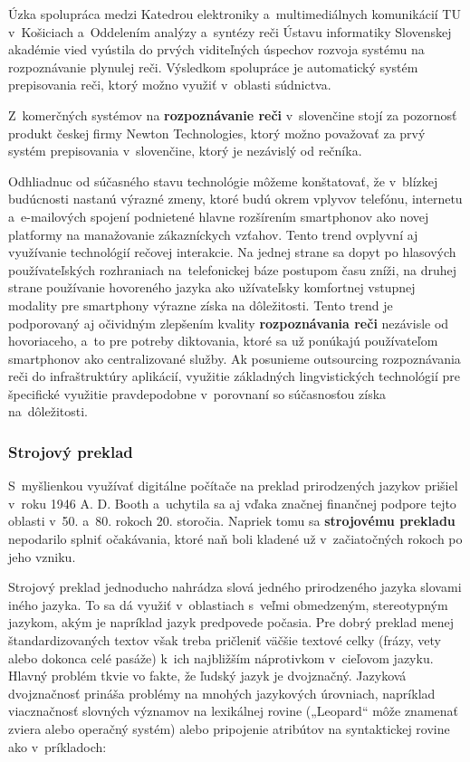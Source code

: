 \begin{multicols}{2}
Úzka spolupráca medzi Katedrou elektroniky a~multimediálnych komunikácií TU v~Košiciach a~Oddelením analýzy a~syntézy reči Ústavu informatiky Slovenskej akadémie vied vyústila do prvých viditeľných úspechov rozvoja systému na rozpoznávanie plynulej reči. Výsledkom spolupráce je automatický systém prepisovania reči, ktorý možno využiť v~oblasti súdnictva.

Z~komerčných systémov na \textbf{rozpoznávanie reči} v~slovenčine stojí za pozornosť produkt českej firmy Newton Technologies, ktorý možno považovať za prvý systém prepisovania v~slovenčine, ktorý je nezávislý od rečníka.

Odhliadnuc od súčasného stavu technológie môžeme konštatovať, že v~blízkej budúcnosti nastanú výrazné zmeny, ktoré budú okrem vplyvov telefónu, internetu a~e-mailových spojení podnietené hlavne rozšírením smartphonov ako novej platformy na manažovanie zákazníckych vzťahov. Tento trend ovplyvní aj využívanie technológií rečovej interakcie. Na jednej strane sa dopyt po hlasových používateľských rozhraniach na~telefonickej báze postupom času zníži, na druhej strane používanie hovoreného jazyka ako užívateľsky komfortnej vstupnej modality pre smartphony výrazne získa na dôležitosti. Tento trend je podporovaný aj očividným zlepšením kvality \textbf{rozpoznávania reči} nezávisle od hovoriaceho, a~to pre potreby diktovania, ktoré sa už ponúkajú používateľom smartphonov ako centralizované služby. Ak posunieme outsourcing rozpoznávania reči do infraštruktúry aplikácií, využitie základných lingvistických technológií pre špecifické využitie pravdepodobne v~porovnaní so súčasnosťou získa na~dôležitosti.  

\subsubsection{Strojový preklad}
S~myšlienkou využívať digitálne počítače na preklad
prirodzených jazykov prišiel v~roku 1946 A. D. Booth a~uchytila sa aj
vďaka značnej finančnej podpore tejto oblasti v~50. a~80. rokoch 20.
storočia. Napriek tomu sa \textbf{strojovému prekladu} nepodarilo
splniť očakávania, ktoré naň boli kladené už v~začiatočných
rokoch po jeho vzniku.

Strojový preklad jednoducho nahrádza slová jedného prirodzeného
jazyka slovami iného jazyka. To sa dá využiť v~oblastiach s~veľmi
obmedzeným, stereotypným jazykom, akým je napríklad jazyk predpovede
počasia. Pre dobrý preklad menej štandardizovaných textov však
treba pričleniť väčšie textové celky (frázy, vety alebo dokonca
celé pasáže) k~ich najbližším náprotivkom v~cieľovom jazyku.
Hlavný problém tkvie vo fakte, že ľudský jazyk je dvojznačný.
Jazyková dvojznačnosť prináša problémy na mnohých jazykových
úrovniach, napríklad viacznačnosť slovných významov na
lexikálnej rovine („Leopard“ môže znamenať zviera alebo
operačný systém) alebo pripojenie atribútov na syntaktickej rovine
ako v~príkladoch:


\end{multicols}

